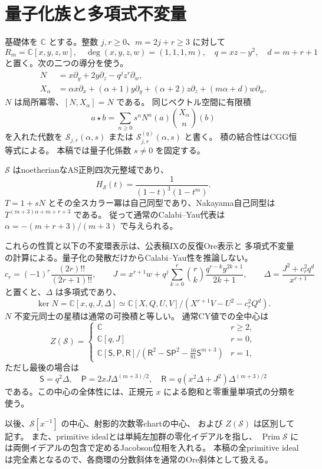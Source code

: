 \section{量子化族と多項式不変量}
\label{sec:primitive-setup-v36}

基礎体を $\mathbb C$ とする。整数 $j,r\ge0$、$m=2j+r\ge3$ に対して
\[
 R_m=\mathbb C[x,y,z,w],\quad \deg(x,y,z,w)=(1,1,1,m),\quad
 q=xz-y^2,\quad d=m+r+1
\]
と置く。次の二つの導分を使う。
\begin{align*}
 N&=x\partial_y+2y\partial_z-q^jz^r\partial_w,\\
 X_\alpha&=\alpha x\partial_x+(\alpha+1)y\partial_y+(\alpha+2)z\partial_z
                  +(m\alpha+d)w\partial_w.
\end{align*}
$N$ は局所冪零、$[N,X_\alpha]=N$ である。
同じベクトル空間に有限積
\[
 a\star b=\sum_{n\ge0}s^nN^n(a)\binom{X_\alpha}{n}(b)
\]
を入れた代数を $\mathcal S_{j,r}(\alpha,s)$ または
$\mathcal S^{(q)}_{j,r}(\alpha,s)$ と書く。
積の結合性はCGG恒等式による\cite[Proposition~2.2]{LecoutreSierra2019}。
本稿では量子化係数 $s\ne0$ を固定する。

\begin{proposition}[基本的な入力]
\label{prop:primitive-ring-input-v36}
$\mathcal S$ はnoetherianなAS正則四次元整域であり、
\[
 H_{\mathcal S}(t)=\frac1{(1-t)^3(1-t^m)}.
\]
$T=1+sN$ とその全スカラー冪は自己同型であり、Nakayama自己同型は
$T^{(m+3)\alpha+m+r+3}$ である。
従って通常のCalabi--Yau代表は
$\alpha=-(m+r+3)/(m+3)$ で与えられる。
\end{proposition}

これらの性質と以下の不変環表示は、公表稿IX\cite{VKPoisson34}の反復Ore表示と
多項式不変量の計算による。量子化の発散だけからCalabi--Yau性を推論しない。
\[
 c_r=(-1)^r\frac{(2r)!!}{(2r+1)!!},\qquad
 J=x^{r+1}w+q^j\sum_{k=0}^r\binom rk\frac{q^{r-k}y^{2k+1}}{2k+1},\qquad
 \Delta=\frac{J^2+c_r^2q^d}{x^{r+1}}
\]
と置くと、$\Delta$ は多項式であり、
\[
 \ker N=\mathbb C[x,q,J,\Delta]
 \simeq\mathbb C[X,Q,U,V]/(X^{r+1}V-U^2-c_r^2Q^d).
\]
$N$ 不変元同士の星積は通常の可換積と等しい。
通常CY値での全中心は
\[
 Z(\mathcal S)=
 \begin{cases}
 \mathbb C&r\ge2,\\
 \mathbb C[q,J]&r=0,\\
 \mathbb C[\mathsf S,\mathsf P,\mathsf R]/
 (\mathsf R^2-\mathsf S\mathsf P^2-\frac{16}{81}\mathsf S^{m+3})&r=1,
 \end{cases}
\]
ただし最後の場合は
\[
 \mathsf S=q^2\Delta,\quad
 \mathsf P=2xJ\Delta^{(m+3)/2},\quad
 \mathsf R=q(x^2\Delta+J^2)\Delta^{(m+3)/2}
\]
である。この中心の全体性には、正規元 $x$ による飽和と零重量単項式の分類を使う。

以後、$\mathcal S[x^{-1}]$ の中心、射影的次数零chartの中心、
および $Z(\mathcal S)$ は区別して記す。
また、primitive idealとは単純左加群の零化イデアルを指し、
$\operatorname{Prim}\mathcal S$ には両側イデアルの包含で定めるJacobson位相を入れる。
本稿の全primitive idealは完全素となるので、各商環の分数斜体を通常のOre斜体として扱える。
